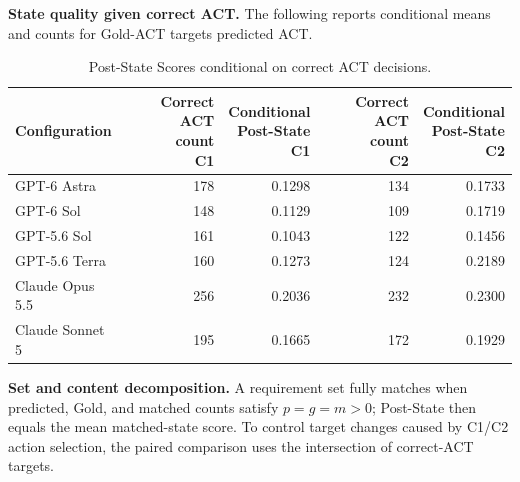 \documentclass{article} %
\begin{document}
\textbf{State quality given correct ACT.} The following reports conditional means and counts for Gold-ACT targets predicted ACT.

\begin{table}[htbp]
\caption{Post-State Scores conditional on correct ACT decisions.}
\label{tab:conditional-post-state}
\centering\normalsize
\setlength{\tabcolsep}{3pt}
\renewcommand{\arraystretch}{1.08}
\begin{tabular}{@{}lrrrr@{}}
\toprule
Configuration & \shortstack[c]{Correct ACT\\count\\C1} & \shortstack[c]{Conditional\\Post-State\\C1} & \shortstack[c]{Correct ACT\\count\\C2} & \shortstack[c]{Conditional\\Post-State\\C2} \\
\midrule
GPT-6 Astra & 178 & 0.1298 & 134 & 0.1733 \\
GPT-6 Sol & 148 & 0.1129 & 109 & 0.1719 \\
GPT-5.6 Sol & 161 & 0.1043 & 122 & 0.1456 \\
GPT-5.6 Terra & 160 & 0.1273 & 124 & 0.2189 \\
Claude Opus 5.5 & 256 & 0.2036 & 232 & 0.2300 \\
Claude Sonnet 5 & 195 & 0.1665 & 172 & 0.1929 \\
\bottomrule
\end{tabular}
\end{table}

\textbf{Set and content decomposition.} A requirement set fully matches when predicted, Gold, and matched counts satisfy $p=g=m>0$; Post-State then equals the mean matched-state score. To control target changes caused by C1/C2 action selection, the paired comparison uses the intersection of correct-ACT targets.
\end{document}
